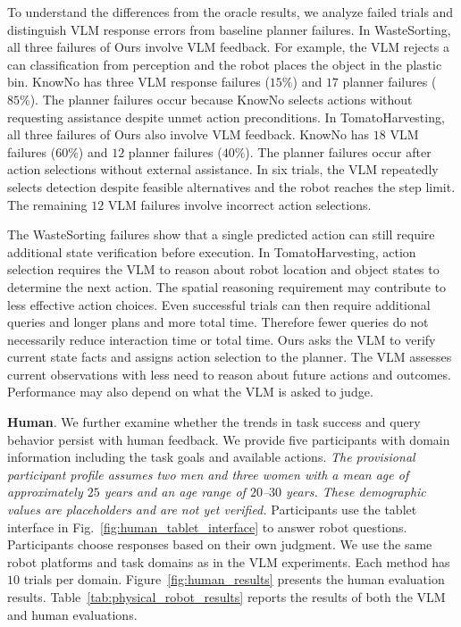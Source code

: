 To understand the differences from the oracle results, we analyze failed trials and distinguish VLM response errors from baseline planner failures. In WasteSorting, all three failures of Ours involve VLM feedback. For example, the VLM rejects a can classification from perception and the robot places the object in the plastic bin. KnowNo has three VLM response failures ($15\%$) and $17$ planner failures ($85\%$). The planner failures occur because KnowNo selects actions without requesting assistance despite unmet action preconditions. In TomatoHarvesting, all three failures of Ours also involve VLM feedback. KnowNo has $18$ VLM failures ($60\%$) and $12$ planner failures ($40\%$). The planner failures occur after action selections without external assistance. In six trials, the VLM repeatedly selects detection despite feasible alternatives and the robot reaches the step limit. The remaining $12$ VLM failures involve incorrect action selections.

The WasteSorting failures show that a single predicted action can still require additional state verification before execution. In TomatoHarvesting, action selection requires the VLM to reason about robot location and object states to determine the next action. The spatial reasoning requirement may contribute to less effective action choices. Even successful trials can then require additional queries and longer plans and more total time. Therefore fewer queries do not necessarily reduce interaction time or total time. Ours asks the VLM to verify current state facts and assigns action selection to the planner. The VLM assesses current observations with less need to reason about future actions and outcomes. Performance may also depend on what the VLM is asked to judge.

\noindent\textbf{Human}\label{exp:human_eval}. We further examine whether the trends in task success and query behavior persist with human feedback. We provide five participants with domain information including the task goals and available actions. \textit{The provisional participant profile assumes two men and three women with a mean age of approximately $25$ years and an age range of $20$--$30$ years. These demographic values are placeholders and are not yet verified.} Participants use the tablet interface in Fig.~\ref{fig:human_tablet_interface} to answer robot questions. Participants choose responses based on their own judgment. We use the same robot platforms and task domains as in the VLM experiments. Each method has $10$ trials per domain. Figure~\ref{fig:human_results} presents the human evaluation results. Table~\ref{tab:physical_robot_results} reports the results of both the VLM and human evaluations.


